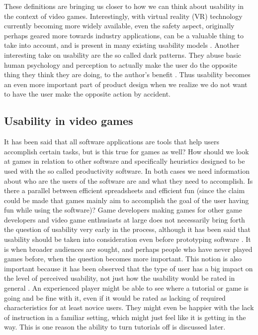 These definitions are bringing us closer to how we can think about usability in the context of video games. Interestingly, with virtual reality (VR) technology currently becoming more widely available, even the safety aspect, originally perhaps geared more towards industry applications, can be a valuable thing to take into account, and is present in many existing usability models \cite{Dubey2012}. Another interesting take on usability are the so called dark patterns. They abuse basic human psychology and perception to actually make the user do the opposite thing they think they are doing, to the author's benefit \cite{Brignull2013}. Thus usability becomes an even more important part of product design when we realize we do not want to have the user make the opposite action by accident.

\subsection{Usability in video games}

It has been said that all software applications are tools that help users accomplish certain tasks, but is this true for games as well? How should we look at games in relation to other software and specifically heuristics designed to be used with the so called productivity software. In both cases we need information about who are the users of the software are and what they need to accomplish. \cite{Ferre2001} Is there a parallel between efficient spreadsheets and efficient fun (since the claim could be made that games mainly aim to accomplish the goal of the user having fun while using the software)? Game developers making games for other game developers and video game enthusiasts at large does not necessarily bring forth the question of usability very early in the process, although it has been said that usability should be taken into consideration even before prototyping software \cite{Holzinger2005}. It is when broader audiences are sought, and perhaps people who have never played games before, when the question becomes more important. \cite{Isbister2008} This notion is also important because it has been observed that the type of user has a big impact on the level of perceived usability, not just how the usability would be rated in general \cite{Cavallin2007}. An experienced player might be able to see where a tutorial or game is going and be fine with it, even if it would be rated as lacking of required characteristics for at least novice users. They might even be happier with the lack of instruction in a familiar setting, which might just feel like it is getting in the way. This is one reason the ability to turn tutorials off is discussed later.

